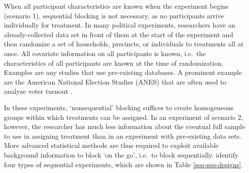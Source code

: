 \documentclass[12pt,]{article}
\begin{document}
When all participant characteristics are known when the experiment
begins (scenario 1), sequential blocking is not necessary, as no
participants arrive individually for treatment. In many political
experiments, researchers have an already-collected data set in front of
them at the start of the experiment and then randomize a set of
households, precincts, or individuals to treatments all at once. All
covariate information on all participants is known, i.e.~the
characteristics of all participants are known at the time of
randomization. Examples are any studies that use pre-existing databases.
A prominent example are the American National Election Studies (ANES)
that are often used to analyze voter turnout \citep[see for
instance][]{jackman_2018_does, leighley_who_2014}.

In these experiments, `nonsequential' blocking suffices to create
homogeneous groups within which treatments can be assigned. In an
experiment of scenario 2, however, the researcher has much less
information about the eventual full sample to use in assigning treatment
than in an experiment with pre-existing data sets. More advanced
statistical methods are thus required to exploit available background
information to block `on the go', i.e.~to block sequentially.
\citet{chow_2007_adaptive} identify four types of sequential
experiments, which are shown in Table \ref{seq-seq-designs}.

\begin{table}[H]
\caption{Different Randomization Designs For Sequential Experiments}
\centering
{}
\label{seq-seq-designs}
\end{table}
\end{document}
